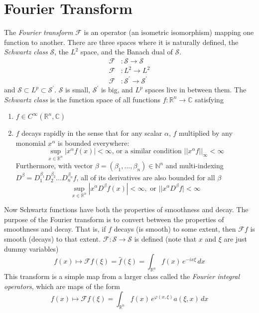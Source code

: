 \documentclass{article}
\theoremstyle{remark}
\theoremstyle{definition}
\begin{document}
\section{Fourier Transform}
The \textit{Fourier transform} $\mathcal{F}$ is an operator (an isometric isomorphism) mapping one function to another. There are three spaces where it is naturally defined, the \textit{Schwartz class} $\mathcal{S}$, the $L^2$ space, and the Banach dual of $\mathcal{S}$. 
\begin{align*}
    \mathcal{F} &: \mathcal{S} \longrightarrow \mathcal{S} \\
    \mathcal{F} &: L^2 \longrightarrow L^2 \\
    \mathcal{F} &: \mathcal{S}^\prime \longrightarrow \mathcal{S}^\prime 
\end{align*}
and $\mathcal{S} \subset L^p \subset \mathcal{S}^\prime$. $\mathcal{S}$ is small, $\mathcal{S}^\prime$ is big, and $L^p$ spaces live in between them. The \textit{Schwartz class} is the function space of all functions $f: \mathbb{R}^n \longrightarrow \mathbb{C}$ satisfying 
\begin{enumerate}
    \item $f \in C^\infty (\mathbb{R}^n, \mathbb{C})$ 
    \item $f$ decays rapidly in the sense that for any scalar $\alpha$, $f$ multiplied by any monomial $x^\alpha$ is bounded everywhere: 
    \[\sup_{x \in \mathbb{R}^n} | x^\alpha f (x)| < \infty \text{, or a similar condition } ||x^\alpha f ||_\infty < \infty \]
    Furthermore, with vector $\beta = (\beta_1, \ldots, \beta_n) \in \mathbb{N}^n$ and multi-indexing $D^\beta = D_1^{\beta_1} D_2^{\beta_2} \ldots D_n^{\beta_n} f$, all of its derivatives are also bounded for all $\beta$
    \[\sup_{x \in \mathbb{R}^n} |x^\alpha D^\beta f(x)| < \infty, \text{ or } ||x^\alpha D^\beta f| < \infty\]
\end{enumerate}
Now Schwartz functions have both the properties of smoothness and decay. The purpose of the Fourier transform is to convert between the properties of smoothness and decay. That is, if $f$ decays (is smooth) to some extent, then $\mathcal{F}f$ is smooth (decays) to that extent. $\mathcal{F}: \mathcal{S} \longrightarrow \mathcal{S}$ is defined (note that $x$ and $\xi$ are just dummy variables)
\[f(x) \mapsto \mathcal{F} f (\xi) = \hat{f} (\xi) = \int_{\mathbb{R}^n} f(x) \, e^{-i x \xi} \, dx \]
This transform is a simple map from a larger class called the \textit{Fourier integral operators}, which are maps of the form 
\[f(x) \mapsto \mathcal{F} f (\xi) = \int_{\mathbb{R}^n} f(x) \, e^{\varphi(x, \xi)} a(\xi, x)\, dx\]
\end{document}
